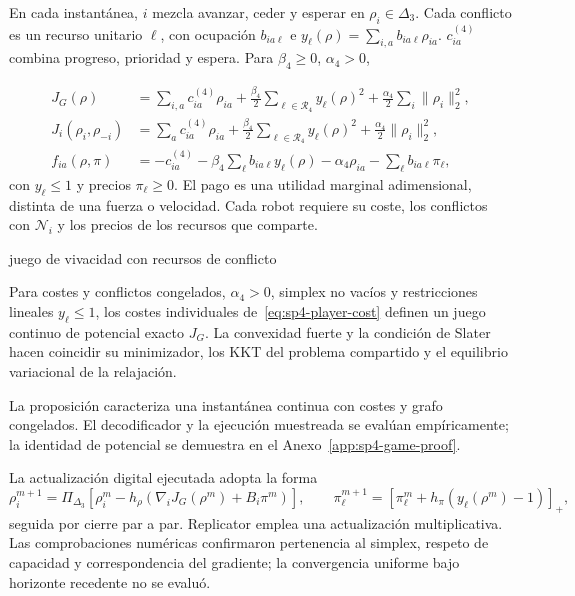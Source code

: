 En cada instantánea, $i$ mezcla avanzar, ceder y esperar en $\rho_i\in\Delta_3$. Cada conflicto es un recurso unitario $\ell$, con ocupación $b_{ia\ell}$ e $y_\ell(\rho)=\sum_{i,a}b_{ia\ell}\rho_{ia}$. $c_{ia}^{(4)}$ combina progreso, prioridad y espera. Para $\beta_4\geq0$, $\alpha_4>0$,

\begin{align}
 J_G(\rho)
 &=\sum_{i,a}c_{ia}^{(4)}\rho_{ia}
 +\frac{\beta_4}{2}\sum_{\ell\in\mathcal R_4}y_\ell(\rho)^2
 +\frac{\alpha_4}{2}\sum_i\|\rho_i\|_2^2,
 \label{eq:sp4-game-potential}\\
 J_i(\rho_i,\rho_{-i})
 &=\sum_a c_{ia}^{(4)}\rho_{ia}
 +\frac{\beta_4}{2}\sum_{\ell\in\mathcal R_4}y_\ell(\rho)^2
 +\frac{\alpha_4}{2}\|\rho_i\|_2^2,
 \label{eq:sp4-player-cost}\\
 f_{ia}(\rho,\pi)
 &=-c_{ia}^{(4)}-\beta_4\sum_\ell b_{ia\ell}y_\ell(\rho)
   -\alpha_4\rho_{ia}-\sum_\ell b_{ia\ell}\pi_\ell,
 \label{eq:sp4-payoff}
\end{align}
con $y_\ell\leq1$ y precios $\pi_\ell\geq0$. El pago es una utilidad marginal adimensional, distinta de una fuerza o velocidad. Cada robot requiere su coste, los conflictos con $\mathcal N_i$ y los precios de los recursos que comparte.

\begin{contribucion}{juego de vivacidad con recursos de conflicto}
\begin{proposicion}
\label{prop:sp4-potential}
Para costes y conflictos congelados, $\alpha_4>0$, simplex no vacíos y restricciones lineales $y_\ell\leq1$, los costes individuales de~\eqref{eq:sp4-player-cost} definen un juego continuo de potencial exacto $J_G$. La convexidad fuerte y la condición de Slater hacen coincidir su minimizador, los KKT del problema compartido y el equilibrio variacional de la relajación.
\end{proposicion}
La proposición caracteriza una instantánea continua con costes y grafo congelados. El decodificador y la ejecución muestreada se evalúan empíricamente; la identidad de potencial se demuestra en el Anexo~\ref{app:sp4-game-proof}.
\end{contribucion}

La actualización digital ejecutada adopta la forma
\begin{equation}
\label{eq:sp4-pd-update}
\rho_i^{m+1}=\Pi_{\Delta_3}\!\left[\rho_i^m-h_\rho
  \left(\nabla_iJ_G(\rho^m)+B_i\pi^m\right)\right],\qquad
\pi_\ell^{m+1}=\left[\pi_\ell^m+h_\pi(y_\ell(\rho^m)-1)\right]_+,
\end{equation}
seguida por cierre par a par. Replicator emplea una actualización multiplicativa. Las comprobaciones numéricas confirmaron pertenencia al simplex, respeto de capacidad y correspondencia del gradiente; la convergencia uniforme bajo horizonte recedente no se evaluó.

